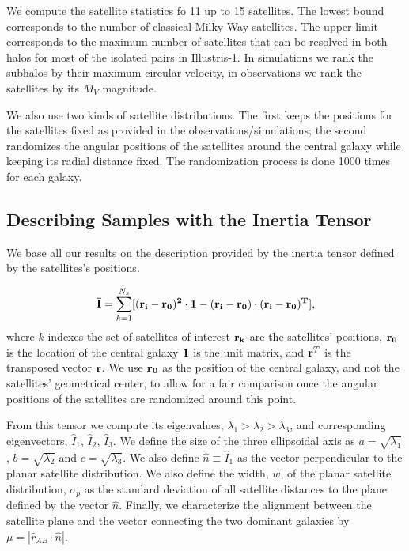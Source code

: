 \documentclass[a4paper,fleqn,usenatbib]{mnras}
\begin{document}
We compute the satellite statistics fo 11 up to 15 satellites.
The lowest bound corresponds to the number of classical Milky Way
satellites.
The upper limit corresponds to the maximum number of satellites that
can be resolved in both halos for most of the isolated pairs in Illustris-1.
In simulations we rank the subhalos by their maximum
circular velocity, in observations we rank the satellites by its $M_V$
magnitude. 

We also use two kinds of satellite distributions. 
The first keeps the positions for the satellites fixed as provided in
the observations/simulations; the second randomizes the angular positions of
the satellites around the central galaxy while keeping its radial
distance fixed. The randomization process is done 1000 times for each
galaxy. 


\subsection{Describing Samples with the Inertia Tensor}
We base all our results on the description provided by the inertia
tensor defined by the satellites's positions.  

\begin{equation}
{\bf{\bar{I}}} = \sum_{k=1}^{N_s}[(\bf{r}_i - \bf{r}_0)^2\cdot \bf{1} -
  (\bf{r}_i-\bf{r}_0)\cdot (\bf{r}_i - \bf{r}_0)^{T}],
\end{equation}
%
where $k$ indexes the set of satellites of interest
$\bf{r}_k$ are the satellites' positions, $\bf{r}_{0}$ is the location
of the central galaxy $\bf{1}$ is the unit matrix,  and  
${\bf r}^T$ is the transposed vector $\bf{r}$. 
We use $\bf{r}_0$ as the position of the central galaxy, and not the
satellites' geometrical center, to allow for a fair comparison once
the angular positions of the satellites are randomized around this
point. 

From this tensor we compute its eigenvalues,
$\lambda_1>\lambda_2>\lambda_3$, and corresponding eigenvectors,
$\hat{I}_1$, $\hat{I}_2$, $\hat{I}_3$.
We define the size of the three ellipsoidal axis as
$a=\sqrt{\lambda_1}$, $b=\sqrt{\lambda_2}$ and $c=\sqrt{\lambda_3}$.
We also define $\hat{n}\equiv \hat{I}_1$ as the vector perpendicular to the
planar satellite distribution. 
We also define the width, $w$, of the planar satellite distribution,
$\sigma_p$ as the standard deviation of all satellite distances to the
plane defined by the vector $\hat{n}$. 
Finally, we characterize the alignment between the satellite plane and the
vector connecting the two dominant galaxies by $\mu=|\hat{r}_{AB}\cdot
\hat{n}|$.
\end{document}
